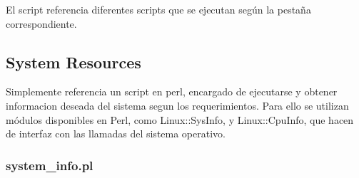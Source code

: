 \documentclass{article}
\begin{document}
El script referencia diferentes scripts que se ejecutan según la pestaña correspondiente.\\

\subsection{System Resources}
Simplemente referencia un script en perl, encargado de ejecutarse y obtener informacion deseada del sistema segun los requerimientos. Para ello se utilizan módulos
disponibles en Perl, como Linux::SysInfo, y Linux::CpuInfo, que hacen de interfaz con las llamadas del sistema operativo.\\
\subsubsection{system\_info.pl}
\end{document}
